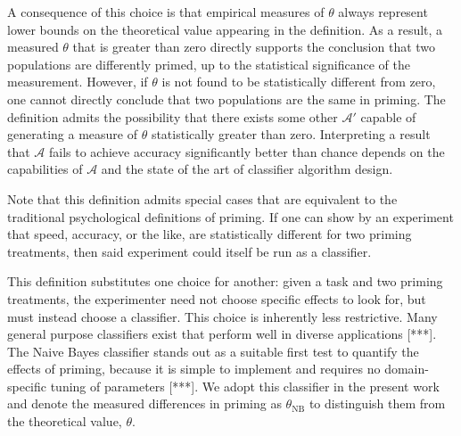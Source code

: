 \documentclass[a4paper]{report}
\begin{document}
A consequence of this choice is that empirical measures of $\theta$ always
represent lower bounds on the theoretical value appearing in the definition.
As a result, a measured $\theta$ that is greater than zero directly 
supports the conclusion that two populations are differently 
primed, up to the statistical significance of the measurement.  However, if 
$\theta$ is not found to be statistically different from zero, one cannot 
directly
conclude that two populations are the same in priming.  The definition
admits the possibility that there exists some other $\mathcal{A}'$ capable of 
generating a measure of $\theta$ statistically greater than zero. 
Interpreting a result
that $\mathcal{A}$ fails to achieve accuracy significantly better than 
chance depends on the capabilities of $\mathcal{A}$ and the state of the art
of classifier algorithm design.

Note that this definition admits special cases that are equivalent to the
traditional psychological definitions of priming.  If one can show by an
experiment that 
speed, accuracy, or the like, are statistically different for two priming 
treatments, then said experiment could itself be run as a classifier.

This definition substitutes one choice for another: given a task
and two priming treatments, the experimenter need not choose specific effects
to look for, but must instead choose a classifier.  This choice is inherently
less restrictive.  Many general purpose classifiers exist that perform
well in diverse applications [***].  The Naive Bayes classifier stands out as 
a suitable first test to quantify the effects of priming,
because it is simple to implement and requires no domain-specific tuning of 
parameters [***].  We adopt this classifier in the present work and 
denote the measured differences in priming as $\theta_\text{NB}$ to distinguish
them from the theoretical value, $\theta$.
\end{document}
